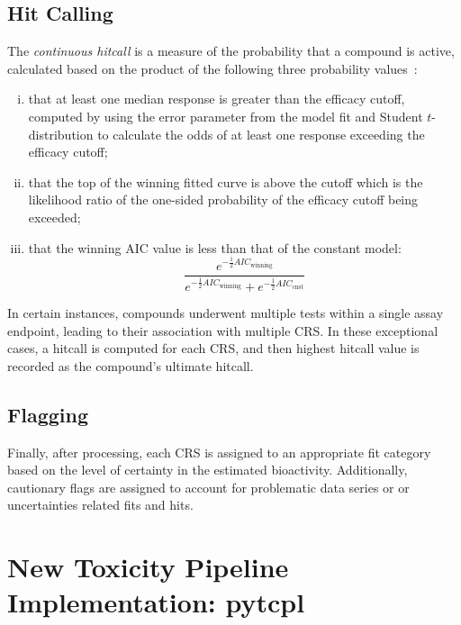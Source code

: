\subsection{Hit Calling}
The \emph{continuous hitcall} is a measure of the probability that a compound is active, calculated based on the product of the following three probability values~\cite{sheffield2021}:

\begin{enumerate}[i.]
    \item that at least one median response is greater than the efficacy cutoff, computed by using the error parameter from the model fit and Student $t$-distribution to calculate the odds of at least one response exceeding the efficacy cutoff;
    \item that the top of the winning fitted curve is above the cutoff which is the likelihood ratio of the one-sided probability of the efficacy cutoff being exceeded;
    \item that the winning AIC value is less than that of the constant model:
    \begin{equation}
    \frac{e^{-\frac{1}{2}AIC_{\text{winning}}}}{e^{-\frac{1}{2}AIC_{\text{winning}}} + e^{-\frac{1}{2}AIC_{\text{cnst}}} }
    \end{equation}
\end{enumerate}

In certain instances, compounds underwent multiple tests within a single assay endpoint, leading to their association with multiple CRS. In these exceptional cases, a hitcall is computed for each CRS, and then highest hitcall value is recorded as the compound's ultimate hitcall.

\subsection{Flagging}
Finally, after processing, each CRS is assigned to an appropriate fit category based on the level of certainty in the estimated bioactivity. Additionally, cautionary flags are assigned to account for problematic data series or or uncertainties related fits and hits.


\section{New Toxicity Pipeline Implementation: pytcpl}\label{sec:pytcpl}

